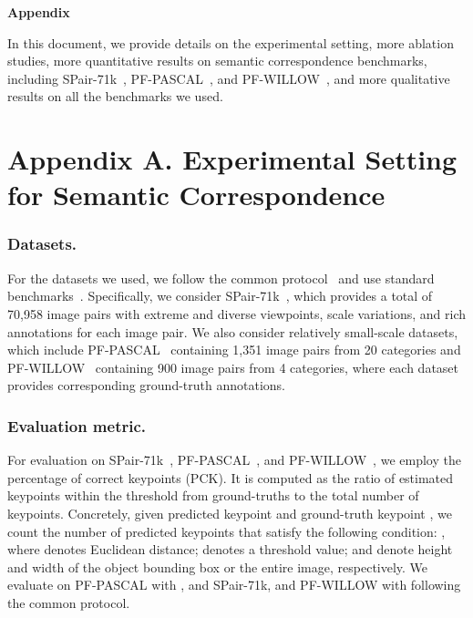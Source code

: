 
\newpage
\begin{center}
	\textbf{\Large Appendix}
\end{center}

In this document, we provide details on the experimental setting, more ablation studies, more quantitative results on semantic correspondence benchmarks, including SPair-71k~\cite{min2019spair}, PF-PASCAL~\cite{ham2017proposal}, and PF-WILLOW~\cite{ham2016proposal}, and more qualitative results on all the benchmarks we used.\vspace{-10pt}

\section*{Appendix A. Experimental Setting for Semantic Correspondence}



\subsubsection{Datasets.}
For the datasets we used, we follow the common protocol~\cite{min2019hyperpixel,min2020learning,Rocco18b,zhao2021multi,huang2019dynamic,min2021convolutional,cho2021semantic} and use standard benchmarks~\cite{ham2016proposal,ham2017proposal,min2019spair}. Specifically, we consider SPair-71k~\cite{min2019spair}, which provides a total of 70,958 image pairs with extreme and diverse viewpoints, scale variations, and rich annotations for each image pair. We also consider relatively small-scale datasets, which include PF-PASCAL~\cite{ham2017proposal} containing 1,351 image pairs from 20 categories and PF-WILLOW~\cite{ham2016proposal} containing 900 image pairs from 4 categories, where each dataset provides corresponding ground-truth annotations.\vspace{-10pt}
\subsubsection{Evaluation metric.}
For evaluation on SPair-71k~\cite{min2019spair}, PF-PASCAL~\cite{ham2017proposal}, and PF-WILLOW~\cite{ham2016proposal}, we employ the percentage of correct keypoints (PCK). It is computed as the ratio of estimated keypoints within the threshold from ground-truths to the total number of keypoints. Concretely, given predicted keypoint  and ground-truth keypoint , we count the number of predicted keypoints that satisfy the following condition: , where  denotes Euclidean distance;  denotes a threshold value;  and  denote height and width of the object bounding box or the entire image, respectively. We evaluate on PF-PASCAL with , and SPair-71k, and PF-WILLOW with  following the common protocol. \vspace{-10pt}

